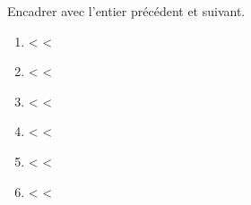 \begin{exercice}{}{}
    Encadrer avec l'entier précédent et suivant. \medskip
    \begin{enumerate}
       \item \makebox[0.3\linewidth]{\dotfill} <  <   \makebox[0.3\linewidth]{\dotfill}\mbox{} \medskip
       \item \makebox[0.3\linewidth]{\dotfill} <  <   \makebox[0.3\linewidth]{\dotfill}\mbox{} \medskip
       \item \makebox[0.3\linewidth]{\dotfill} <  <   \makebox[0.3\linewidth]{\dotfill}\mbox{} \medskip
       \item \makebox[0.3\linewidth]{\dotfill} <  <   \makebox[0.3\linewidth]{\dotfill}\mbox{} \medskip
       \item \makebox[0.3\linewidth]{\dotfill} <  <   \makebox[0.3\linewidth]{\dotfill}\mbox{} \medskip
       \item \makebox[0.3\linewidth]{\dotfill} <  <   \makebox[0.3\linewidth]{\dotfill}\mbox{}
    \end{enumerate}
\end{exercice}